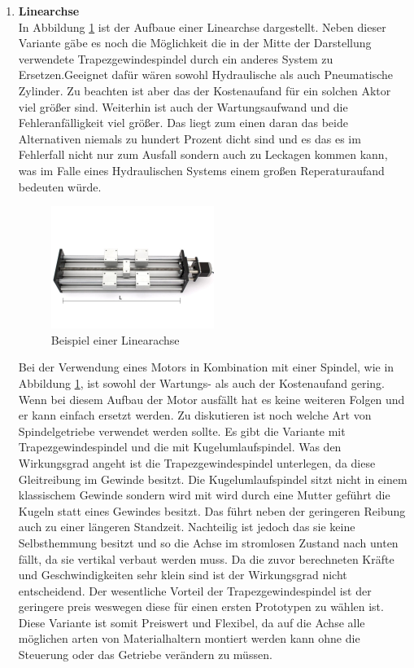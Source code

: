 \begin{enumerate}[label=(\alph*)]
    \item \textbf{Linearchse}\\
    In Abbildung \ref{fig:linearachse} ist der Aufbaue einer Linearchse dargestellt. Neben dieser Variante gäbe es noch die Möglichkeit die in der Mitte der Darstellung verwendete Trapezgewindespindel durch ein anderes System zu Ersetzen.Geeignet dafür wären sowohl Hydraulische als auch Pneumatische Zylinder. Zu beachten ist aber das der Kostenaufand für ein solchen Aktor viel größer sind. Weiterhin ist auch der Wartungsaufwand und die Fehleranfälligkeit viel größer. Das liegt zum einen daran das beide Alternativen niemals zu hundert Prozent dicht sind und es das es im Fehlerfall nicht nur zum Ausfall sondern auch zu Leckagen kommen kann, was im Falle eines Hydraulischen Systems einem großen Reperaturaufand bedeuten würde.
    \begin{figure}[!h]
        \centering
        \includegraphics[width = 0.5\textwidth]{Abbildungen/linearachse-konfigurator-easy-mechatronics-system-1216a-nennlaenge-150mm~2.jpg}
        \caption{Beispiel einer Linearachse \cite{LinearachseDOLD.}}
        \label{fig:linearachse}
    \end{figure}
    
    Bei der Verwendung eines Motors in Kombination mit einer Spindel, wie in Abbildung \ref{fig:linearachse}, ist sowohl der Wartungs- als auch der Kostenaufand gering. Wenn bei diesem Aufbau der Motor ausfällt hat es keine weiteren Folgen und er kann einfach ersetzt werden. Zu diskutieren ist noch welche Art von Spindelgetriebe verwendet werden sollte. Es gibt die Variante mit Trapezgewindespindel und die mit Kugelumlaufspindel. Was den Wirkungsgrad angeht ist die Trapezgewindespindel unterlegen, da diese Gleitreibung im Gewinde besitzt. Die Kugelumlaufspindel sitzt nicht in einem klassischem Gewinde sondern wird mit wird durch eine Mutter geführt die Kugeln statt eines Gewindes besitzt. Das führt neben der geringeren Reibung auch zu einer längeren Standzeit. Nachteilig ist jedoch das sie keine Selbsthemmung besitzt und so die Achse im stromlosen Zustand nach unten fällt, da sie vertikal verbaut werden muss. Da die zuvor berechneten Kräfte und Geschwindigkeiten sehr klein sind ist der Wirkungsgrad nicht entscheidend. Der wesentliche Vorteil der Trapezgewindespindel ist der geringere preis weswegen diese für einen ersten Prototypen zu wählen ist.
    Diese Variante ist somit Preiswert und Flexibel, da auf die Achse alle möglichen arten von Materialhaltern montiert werden kann ohne die Steuerung oder das Getriebe verändern zu müssen.


\end{enumerate}
